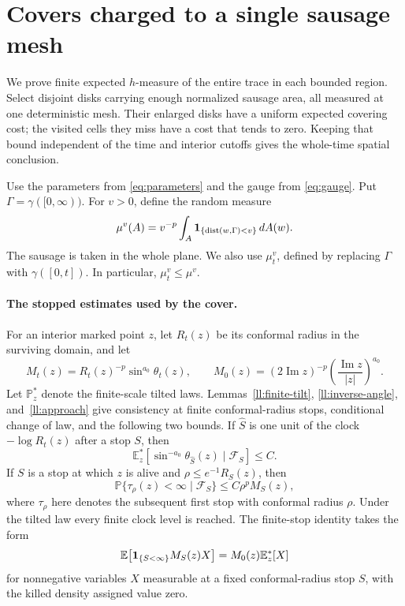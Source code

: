 \documentclass[11pt]{article}
\theoremstyle{definition}
\theoremstyle{remark}
\numberwithin{equation}{section}
\begin{document}
\section{Covers charged to a single sausage mesh}
\label{sec:dense-cover}

We prove finite expected $h$-measure of the entire trace in each bounded
region. Select disjoint disks carrying enough normalized sausage area,
all measured at one deterministic mesh. Their enlarged disks have a
uniform expected covering cost; the visited cells they miss have a cost
that tends to zero. Keeping that bound independent of the time and
interior cutoffs gives the whole-time spatial conclusion.

Use the parameters from \eqref{eq:parameters} and the gauge
from \eqref{eq:gauge}. Put
\(\Gamma=\gamma([0,\infty))\).  For \(v>0\), define the random measure
\begin{equation}
 \mu^v(A)=v^{-p}\int_A
       {\bf1}_{\{\operatorname{dist}(w,\Gamma)<v\}}\,dA(w).
 \label{eq:cover-sausage}
\end{equation}
The sausage is taken in the whole plane.  We also use \(\mu_t^v\),
defined by replacing \(\Gamma\) with \(\gamma([0,t])\).  In particular,
\(\mu_t^v\le\mu^v\).

\paragraph{The stopped estimates used by the cover.}
For an interior marked point \(z\), let \(R_t(z)\) be its conformal
radius in the surviving domain, and let
\[
 M_t(z)=R_t(z)^{-p}\sin^{a_0}\theta_t(z),\qquad
 M_0(z)=(2\operatorname{Im}z)^{-p}
        \left(\frac{\operatorname{Im}z}{|z|}\right)^{a_0}.
\]
Let \(\mathbb P_z^*\) denote the finite-scale tilted laws.  Lemmas~\ref{ll:finite-tilt}, \ref{ll:inverse-angle}, and~\ref{ll:approach}
give consistency at finite conformal-radius stops, conditional change
of law, and the following two bounds.
If \(\widehat S\) is one unit of the clock \(-\log R_t(z)\)
after a stop \(S\), then
\begin{equation}
 \mathbb E_z^*\!\left[
      \sin^{-a_0}\theta_{\widehat S}(z)\mid\mathcal F_S\right]\le C.
 \label{eq:cover-angle}
\end{equation}
If \(S\) is a stop at which \(z\) is alive and
\(\rho\le e^{-1}R_S(z)\), then
\begin{equation}
 \mathbb P\{\tau_\rho(z)<\infty\mid\mathcal F_S\}
      \le C\rho^p M_S(z),
 \label{eq:cover-one-point}
\end{equation}
where \(\tau_\rho\) here denotes the subsequent first stop with
conformal radius \(\rho\).  Under the tilted law every finite clock
level is reached.  The finite-stop identity takes the form
\begin{equation}
 \mathbb E\!\left[
       {\bf1}_{\{S<\infty\}}M_S(z)X\right]
        =M_0(z)\mathbb E_z^*[X]
 \label{eq:cover-finite-tilt}
\end{equation}
for nonnegative variables \(X\) measurable at a fixed conformal-radius
stop \(S\), with the killed density assigned value zero.
\end{document}
